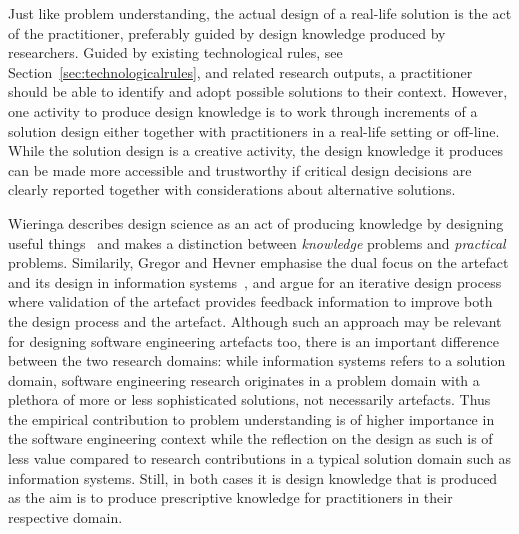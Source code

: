 \documentclass[graybox]{svmult}
\begin{document}
Just like problem understanding, the actual design of a real-life solution is the act of the practitioner, preferably guided by design knowledge produced by researchers. %
Guided by existing technological rules, see Section~\ref{sec:technologicalrules}, and related research outputs, a practitioner should be able to identify and adopt possible solutions to their context. However, one activity to produce design knowledge is to work through increments of a solution design either together with practitioners in a real-life setting or off-line. %
While the solution design is a creative activity, the design knowledge it produces can be made more accessible and trustworthy if critical design decisions are clearly reported together with considerations about alternative solutions.





Wieringa describes design science as an act of producing knowledge by designing useful things~\cite{wieringa_design_2009} and makes a distinction between \emph{knowledge} problems and \emph{practical} problems. Similarily, Gregor and Hevner emphasise the dual focus on the artefact and its design in information systems~\cite{gregor_positioning_2013}, and argue for an iterative design process where validation of the artefact provides feedback information to improve both the design process and the artefact. Although such an approach may be relevant for designing software engineering artefacts too, there is an important difference between the two research domains: while information systems refers to a solution domain, software engineering research originates in a problem domain with a plethora of more or less sophisticated solutions, not necessarily artefacts. Thus the empirical contribution to problem understanding is of higher importance in the software engineering context while the reflection on the design as such is of less value compared to research contributions in a typical solution domain such as information systems. Still, in both cases it is design knowledge that is produced as the aim is to produce prescriptive knowledge for practitioners in their respective domain. 

 
\end{document}
